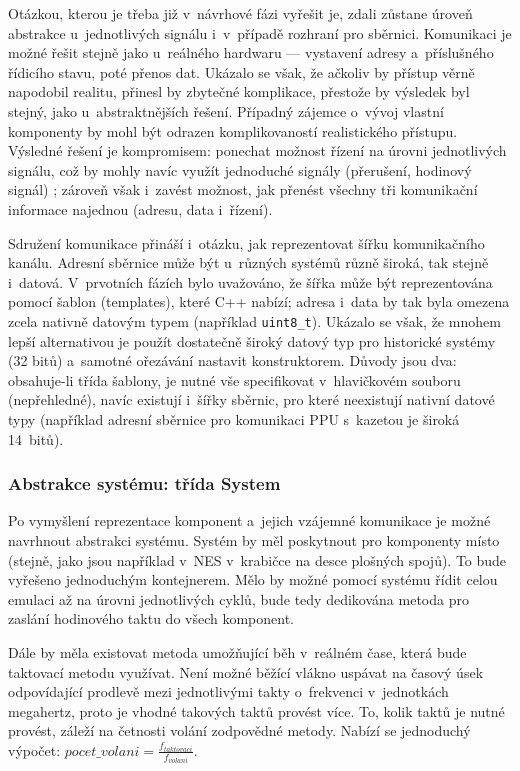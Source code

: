Otázkou, kterou je třeba již v~návrhové fázi vyřešit je, zdali zůstane úroveň abstrakce u~jednotlivých signálu i~v~případě rozhraní pro sběrnici. Komunikaci je možné řešit stejně jako u~reálného hardwaru --- vystavení adresy a~příslušného řídicího stavu, poté přenos dat. Ukázalo se však, že ačkoliv by přístup věrně napodobil realitu, přinesl by zbytečné komplikace, přestože by výsledek byl stejný, jako u~abstraktnějších řešení. Případný zájemce o~vývoj vlastní komponenty by mohl být odrazen komplikovaností realistického přístupu. Výsledné řešení je kompromisem: ponechat možnost řízení na úrovni jednotlivých signálu, což by mohly navíc využít jednoduché signály (přerušení, hodinový signál) ; zároveň však i~zavést možnost, jak přenést všechny tři komunikační informace najednou (adresu, data i~řízení).

Sdružení komunikace přináší i~otázku, jak reprezentovat šířku komunikačního kanálu. Adresní sběrnice může být u~různých systémů různě široká, tak stejně i~datová. V~prvotních fázích bylo uvažováno, že šířka může být reprezentována pomocí šablon (templates), které C++ nabízí; adresa i~data by tak byla omezena zcela nativně datovým typem (například \texttt{uint8\_t}). Ukázalo se však, že mnohem lepší alternativou je použít dostatečně široký datový typ pro historické systémy (32 bitů) a~samotné ořezávání nastavit konstruktorem. Důvody jsou dva: obsahuje-li třída šablony, je nutné vše specifikovat v~hlavičkovém souboru (nepřehledné), navíc existují i~šířky sběrnic, pro které neexistují nativní datové typy (například adresní sběrnice pro komunikaci PPU s~kazetou je široká 14~bitů).

\subsubsection{Abstrakce systému: třída System}
Po vymyšlení reprezentace komponent a~jejich vzájemné komunikace je možné navrhnout abstrakci systému. Systém by měl poskytnout pro komponenty místo (stejně, jako jsou například v~NES v~krabičce na desce plošných spojů). To bude vyřešeno jednoduchým kontejnerem. Mělo by možné pomocí systému řídit celou emulaci až na úrovni jednotlivých cyklů, bude tedy dedikována metoda pro zaslání hodinového taktu do všech komponent.

Dále by měla existovat metoda umožňující běh v~reálném čase, která bude taktovací metodu využívat. Není možné běžící vlákno uspávat na časový úsek odpovídající prodlevě mezi jednotlivými takty o~frekvenci v~jednotkách megahertz, proto je vhodné takových taktů provést více. To, kolik taktů je nutné provést, záleží na četnosti volání zodpovědné metody. Nabízí se jednoduchý výpočet: $pocet\_volani= \frac{f_{taktovaci}}{f_{volani}}$.

